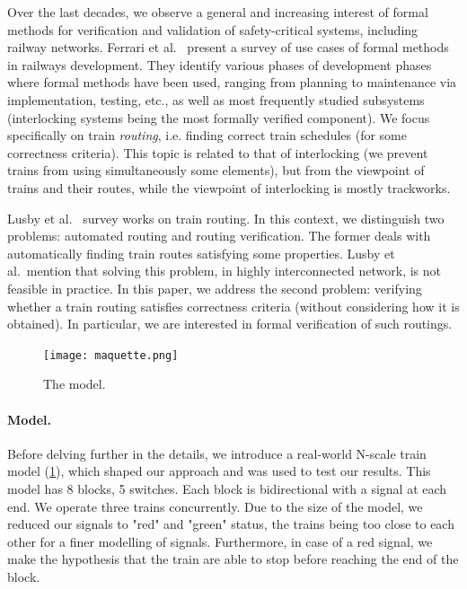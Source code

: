 \documentclass[runningheads]{llncs}
\begin{document}
Over the last decades, we observe a general and increasing interest of formal methods for verification and validation of safety-critical systems, including railway networks.
Ferrari et al.~\cite{Ferrari_Formal_2022} present a survey of use cases of formal methods in railways development. They identify various phases of development phases where formal methods have been used, ranging from planning to maintenance via implementation, testing, etc., as well as most frequently studied subsystems (interlocking systems being the most formally verified component). We focus specifically on train \emph{routing}, i.e. finding correct train schedules (for some correctness criteria). This topic is related to that of interlocking (we prevent trains from using simultaneously some elements), but from the viewpoint of trains and their routes, while the viewpoint of interlocking is mostly trackworks.

Lusby et al.~\cite{lusby_railway_2011} survey works on train routing. In this context, we distinguish two problems: automated routing and routing verification. The former deals with automatically finding train routes satisfying some properties. Lusby et al.\ mention that solving this problem, in highly interconnected network, is not feasible in practice. In this paper, we address the second problem: verifying whether a train routing satisfies correctness criteria (without considering how it is obtained). In particular, we are interested in formal verification of such routings.

\begin{figure}
	\begin{minipage}{0.28\textwidth}
		\centering
		\vspace{-0mm}
		\texttt{[image: maquette.png]}
		\caption{The model.}
		\label{fig:maquette}
	\end{minipage}
\end{figure}

\paragraph{Model.}
Before delving further in the details, we introduce a real-world N-scale train model (\ref{fig:maquette}), which shaped our approach and was used to test our results. This model has 8 blocks, 5 switches. Each block is bidirectional with a signal at each end. %
 We operate three trains concurrently. Due to the size of the model, we reduced our signals  to "red" and "green" status, the trains being too close to each other for a finer modelling of signals. Furthermore, in case of a red signal, we make the hypothesis that the train are able to stop before reaching the end of the block.
\end{document}
